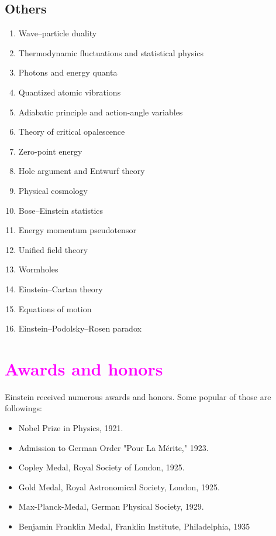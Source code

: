 \documentclass{article}
\begin{document}
\subsection{Others}
\begin{enumerate}
    \item Wave–particle duality
    \item Thermodynamic fluctuations and statistical physics
    \item Photons and energy quanta
    \item Quantized atomic vibrations
    \item Adiabatic principle and action-angle variables
    \item Theory of critical opalescence
    \item Zero-point energy
    \item Hole argument and Entwurf theory
    \item Physical cosmology
    \item Bose–Einstein statistics
    \item Energy momentum pseudotensor
    \item Unified field theory
    \item Wormholes
    \item Einstein–Cartan theory
    \item Equations of motion
    \item Einstein–Podolsky–Rosen paradox
\end{enumerate}



\section{\textcolor{magenta}{Awards and honors}}
Einstein received numerous awards and honors. Some popular of those are followings:

\begin{itemize}
    \item Nobel Prize in Physics, 1921. 
    \item Admission to German Order "Pour La Mérite," 1923. 
    \item Copley Medal, Royal Society of London, 1925. 
    \item Gold Medal, Royal Astronomical Society, London, 1925. 
    \item Max-Planck-Medal, German Physical Society, 1929. 
    \item Benjamin Franklin Medal, Franklin Institute, Philadelphia, 1935
\end{itemize}
\end{document}
